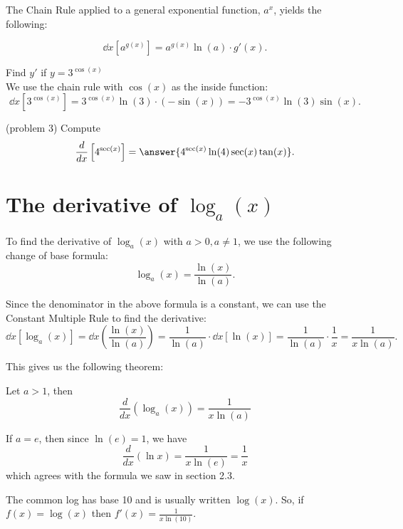 \documentclass[handout]{ximera}
\begin{document}
The Chain Rule applied to a general exponential function, $a^x$, yields the following:

\[
\dd{x} \left[a^{g(x)}\right] = a^{g(x)} \ln(a) \cdot g'(x).
\]

\begin{example}[example 3]
Find $y'$ if $y = 3^{\cos(x)}$\\
We use the chain rule with $\cos(x)$ as the inside function:
\[
\dd{x} \left[3^{\cos(x)}\right] = 3^{\cos(x)} \ln(3) \cdot (-\sin(x)) = -3^{\cos(x)} \ln(3) \sin(x).
\]
\end{example}

\begin{problem}(problem 3)
Compute
\[
\dd{x} \left[ 4^{\sec(x)}\right] = \answer{4^{\sec(x)}\ln(4) \sec(x)\tan(x)}.
\]
\end{problem}


\section{The derivative of $\log_a(x)$}


To find the derivative of $\log_a(x)$ with $a > 0, a \neq 1$, we use the following change of base formula:
\[
\log_a(x) = \frac{\ln(x)}{\ln(a)}.
\]

Since the denominator in the above formula is a constant, we can use the Constant Multiple Rule to find the derivative:
\[
\dd{x} \left[\log_a(x)\right] = \dd{x} \left(\frac{\ln(x)}{\ln(a)}\right) = \frac{1}{\ln(a)}\cdot \dd{x} \left[\ln(x)\right] = \frac{1}{\ln(a)} \cdot \frac{1}{x} = \frac{1}{x\ln(a)}.
\]

This gives us the following theorem:

\begin{theorem}
Let $a >1$, then
\[
\frac{d}{dx}\left(\log_a(x)\right) = \frac{1}{x \ln (a)}
\]
\end{theorem}

\begin{remark}
If $a = e$, then since $\ln(e) = 1$, we have 
\[
\frac{d}{dx}\left(\ln x\right) = \frac{1}{x \ln (e)} = \frac{1}{x}
\]
which agrees with the formula we saw in section 2.3.
\end{remark}

\begin{example}[example 4]
The common log has base 10 and is usually written $\log(x)$.
So, if $f(x) = \log(x)$ then $f'(x) = \frac{1}{x\ln(10)}.$
\end{example}
\end{document}
